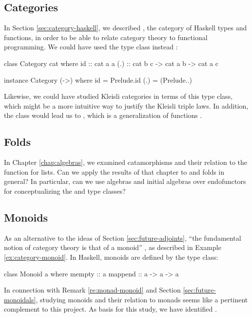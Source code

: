 \subsection{Categories}
\label{sec:future-categories}

In Section \ref{sec:category-haskell}, we described \hask, the
category of Haskell types and functions, in order to be able to relate
category theory to functional programming. We could have used the
 type class instead
\parencites[49--51]{yorgey-2009}[74--75]{elkins-2009}:
\begin{codehaskell}
class Category cat where
  id  :: cat a a
  (.) :: cat b c -> cat a b -> cat a c

instance Category (->) where
  id  = Prelude.id
  (.) = (Prelude..)
\end{codehaskell}
Likewise, we could have studied Kleisli categories
\parencite[59--60]{moggi-1991} in terms of this type class, which
might be a more intuitive way to justify the Kleisli triple laws. In
addition, the  class would lead us to
, which is a generalization of functions
\parencite[51--57]{yorgey-2009}.

\subsection{Folds}

In Chapter \ref{chap:algebras}, we examined catamorphisms and their
relation to the  function for lists. Can we apply
the results of that chapter to  and folds in
general? In particular, can we use algebras and initial algebras over
endofunctors for conceptualizing the 
\parencite[44--47]{yorgey-2009} and 
\parencites[§ 3]{mcbride-paterson-2008}[47--49]{yorgey-2009} type
classes?

\subsection{Monoids}
\label{sec:future-monoids}

As an alternative to the ideas of Section \ref{sec:future-adjoints},
``the fundamental notion of category theory is that of a monoid''
\parencite[vii]{maclane-1998}, as described in Example
\ref{ex:category-monoid}. In Haskell, monoids are defined by the
 type class:
\begin{codehaskell}
class Monoid a where
  mempty  :: a
  mappend :: a -> a -> a
\end{codehaskell}
In connection with Remark \ref{re:monad-monoid} and Section
\ref{sec:future-monoidals}, studying monoids and their relation to
monads seems like a pertinent complement to this project. As basis for
this study, we have identified \parencites[§
  VII]{maclane-1998}[39--44]{yorgey-2009}.

\clearemptydoublepage
